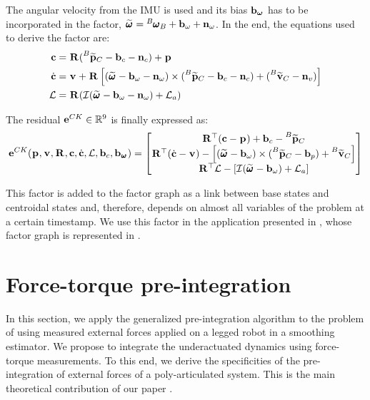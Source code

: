 The angular velocity from the IMU is used and its bias ${\bf b}_{{\bm \omega}}$ has to be incorporated in the factor, $\prescript{}{}{\widetilde{\pmb{\omega}}}_{} = \prescript{B}{}{\pmb{\omega}}_{B} + {\bf b}_{\omega} + {\bf n}_{\omega}$.  
In the end, the equations used to derive the factor are:
%
\begin{equation}
    \begin{split}
    {\bf c} &= \prescript{}{}{{\bf R}}_{} (\prescript{B}{}{\widetilde{{\bf p}}}_{C} -  {\bf b}_{c} - {\bf n}_{c}) + \prescript{}{}{{\bf p}}_{}
    \\
    \dot{{\bf c}} &= 
    \prescript{}{}{{\bf v}}_{} + \prescript{}{}{{\bf R}}_{} \left[ (\prescript{}{}{\widetilde{\pmb{\omega}}}_{} - {\bf b}_{\omega} - {\bf n}_{\omega}) \times (\prescript{B}{}{\widetilde{{\bf p}}}_{C} -  {\bf b}_c - {\bf n}_c) + (\prescript{B}{}{\widetilde{{\bf v}}}_{C} - {\bf n}_{v}) \right]
    \\
    \mathcal{L} &= \prescript{}{}{{\bf R}}_{}(\mathcal{I} (\prescript{}{}{\widetilde{\pmb{\omega}}}_{} - {\bf b}_{\omega} - {\bf n}_{\omega}) + \mathcal{L}_a)
    \end{split}
\end{equation}

The residual ${\bf e}^{CK} \in \mathbb{R}^9$ is finally expressed as:
%
\begin{equation}
    {\bf e}^{CK}(\prescript{}{}{{\bf p}}_{}, \prescript{}{}{{\bf v}}_{}, \prescript{}{}{{\bf R}}_{}, {\bf c}, \dot{{\bf c}}, \mathcal{L}, {\bf b}_c, {\bf b}_{\prescript{}{}{\pmb{\omega}}_{}})=
    \begin{bmatrix}
        \prescript{}{}{{\bf R}}_{}^{\top}({\bf c} - \prescript{}{}{{\bf p}}_{}) + {\bf b}_{c} - \prescript{B}{}{\widetilde{{\bf p}}}_{C}
        \\
        \prescript{}{}{{\bf R}}_{}^{\top}(\dot{{\bf c}} - \prescript{}{}{{\bf v}}_{}) - \left[(\prescript{}{}{\widetilde{\pmb{\omega}}}_{} - {\bf b}_{\omega}) \times (\prescript{B}{}{\widetilde{{\bf p}}}_{C} -  {\bf b}_{p}) + \prescript{B}{}{\widetilde{{\bf v}}}_{C} \right]
        \\
        \prescript{}{}{{\bf R}}_{}^{\top}\mathcal{L} - \left[\mathcal{I} (\prescript{}{}{\widetilde{\pmb{\omega}}}_{} - {\bf b}_{\omega}) + \mathcal{L}_a \right]
    \end{bmatrix}
    \label{eq:CK_residual}
\end{equation}

This factor is added to the factor graph as a link between base states and centroidal states and, therefore, depends on almost all variables of the problem
at a certain timestamp. We use this factor in the application presented in , whose factor graph is represented in 
.



\section{Force-torque pre-integration}
\label{sec:force_torque_preint}
In this section, we apply the generalized pre-integration algorithm to the problem of using measured external
forces applied on a legged robot in a smoothing estimator. We propose to integrate the underactuated dynamics  using force-torque measurements.
To this end, we derive the specificities of the pre-integration of external forces of a poly-articulated system. This is the main theoretical contribution
of our paper \cite{fourmy2021contact}.

